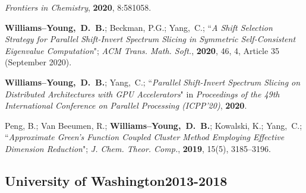 \documentclass[10pt]{res} %
\newcommand*\me[0]{{\bf Williams--Young,~D.~B.}}
\newcommand*\cy[0]{Yang,~C.}
\begin{document}
\begin{resume}
\begin{etaremune}
        \emph{Frontiers in Chemistry}, \textbf{2020}, 8:581058.
  \item \me; Beckman, P.G.; \cy;
        ``\emph{A Shift Selection Strategy for Parallel Shift-Invert Spectrum Slicing in Symmetric Self-Consistent 
        Eigenvalue Computation}";
        \emph{ACM Trans. Math. Soft.}, \textbf{2020}, 46, 4, Article 35 (September 2020).
  \item \me; \cy;
        ``\emph{Parallel Shift-Invert Spectrum Slicing on Distributed Architectures with GPU Accelerators}"
        in \emph{Proceedings of the 49th International Conference on Parallel Processing (ICPP'20)}, \textbf{2020}.
  \item Peng, B.; Van Beeumen, R.; \me; Kowalski, K.; \cy;
        ``\emph{Approximate Green’s Function Coupled Cluster Method Employing 
          Effective Dimension Reduction}";
        \emph{J. Chem. Theor. Comp.}, \textbf{2019}, 15(5), 3185--3196.
\end{etaremune}

\subsection{University of Washington\hfill 2013-2018}


\end{resume}
\end{document}
